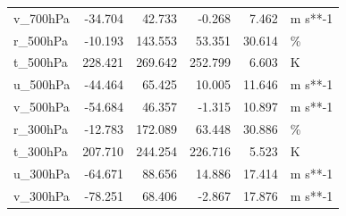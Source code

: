 \begin{table}
\begin{tabular}{lrrrrl}
 v\_700hPa &   -34.704 &     42.733 &     -0.268 &    7.462 & m s**-1 \\
 r\_500hPa &   -10.193 &    143.553 &     53.351 &   30.614 &       \% \\
 t\_500hPa &   228.421 &    269.642 &    252.799 &    6.603 &       K \\
 u\_500hPa &   -44.464 &     65.425 &     10.005 &   11.646 & m s**-1 \\
 v\_500hPa &   -54.684 &     46.357 &     -1.315 &   10.897 & m s**-1 \\
 r\_300hPa &   -12.783 &    172.089 &     63.448 &   30.886 &       \% \\
 t\_300hPa &   207.710 &    244.254 &    226.716 &    5.523 &       K \\
 u\_300hPa &   -64.671 &     88.656 &     14.886 &   17.414 & m s**-1 \\
 v\_300hPa &   -78.251 &     68.406 &     -2.867 &   17.876 & m s**-1 \\
\bottomrule
\end{tabular}
\end{table}
